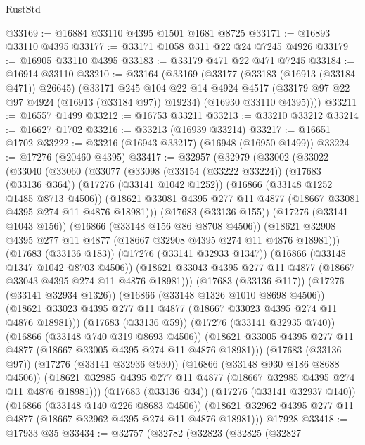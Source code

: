 \begin{lexlean}{RustStd}
\begin{coremodule}
@33169 := @16884 @33110 @4395 @1501 @1681 @8725
@33171 := @16893 @33110 @4395
@33177 := @33171 @1058 @311 @22 @24 @7245 @4926
@33179 := @16905 @33110 @4395
@33183 := @33179 @471 @22 @471 @7245
@33184 := @16914 @33110
@33210 := @33164
    (@33169
      (@33177
        (@33183 (@16913 (@33184 @471)) @26645)
        (@33171
          @245
          @104
          @22
          @14
          @4924
          @4517
          (@33179 @97 @22 @97 @4924 (@16913 (@33184 @97)) @19234)
          (@16930 @33110 @4395))))
@33211 := @16557 @1499
@33212 := @16753 @33211
@33213 := @33210 @33212
@33214 := @16627 @1702
@33216 := @33213 (@16939 @33214)
@33217 := @16651 @1702
@33222 := @33216 (@16943 @33217) (@16948 (@16950 @1499))
@33224 := @17276 (@20460 @4395)
@33417 := @32957
    (@32979
      (@33002
        (@33022
          (@33040
            (@33060
              (@33077
                (@33098
                  (@33154 (@33222 @33224))
                  (@17683 (@33136 @364))
                  (@17276 (@33141 @1042 @1252))
                  (@16866 (@33148 @1252 @1485 @8713 @4506))
                  (@18621 @33081 @4395 @277 @11 @4877 (@18667 @33081 @4395 @274 @11 @4876 @18981)))
                (@17683 (@33136 @155))
                (@17276 (@33141 @1043 @156))
                (@16866 (@33148 @156 @86 @8708 @4506))
                (@18621 @32908 @4395 @277 @11 @4877 (@18667 @32908 @4395 @274 @11 @4876 @18981)))
              (@17683 (@33136 @183))
              (@17276 (@33141 @32933 @1347))
              (@16866 (@33148 @1347 @1042 @8703 @4506))
              (@18621 @33043 @4395 @277 @11 @4877 (@18667 @33043 @4395 @274 @11 @4876 @18981)))
            (@17683 (@33136 @117))
            (@17276 (@33141 @32934 @1326))
            (@16866 (@33148 @1326 @1010 @8698 @4506))
            (@18621 @33023 @4395 @277 @11 @4877 (@18667 @33023 @4395 @274 @11 @4876 @18981)))
          (@17683 (@33136 @59))
          (@17276 (@33141 @32935 @740))
          (@16866 (@33148 @740 @319 @8693 @4506))
          (@18621 @33005 @4395 @277 @11 @4877 (@18667 @33005 @4395 @274 @11 @4876 @18981)))
        (@17683 (@33136 @97))
        (@17276 (@33141 @32936 @930))
        (@16866 (@33148 @930 @186 @8688 @4506))
        (@18621 @32985 @4395 @277 @11 @4877 (@18667 @32985 @4395 @274 @11 @4876 @18981)))
      (@17683 (@33136 @34))
      (@17276 (@33141 @32937 @140))
      (@16866 (@33148 @140 @226 @8683 @4506))
      (@18621 @32962 @4395 @277 @11 @4877 (@18667 @32962 @4395 @274 @11 @4876 @18981)))
    @17928
@33418 := @17933 @35
@33434 := @32757
    (@32782
      (@32823
        (@32825
          (@32827

\end{coremodule}
\end{lexlean}
